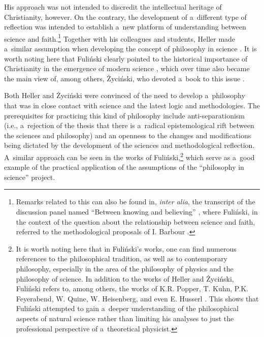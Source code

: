 His approach was not intended to discredit the intellectual heritage of Christianity, however. On the contrary, the development of a~different type of reflection was intended to establish a~new platform of understanding between science and faith.\footnote{Remarks related to this can also be found in, \textit{inter alia}, the transcript of the discussion panel named ``Between knowing and believing'' 
\parencite[][]{heller_watpliwosci_1990}, %
 where Fuliński, in the context of the question about the relationship between science and faith, referred to the methodological proposals of I. Barbour 
\parencite[][]{fulinski_glos_1991}.%
} Together with his colleagues and students, Heller made a~similar assumption when developing the concept of philosophy in science 
\parencites[e.g][]{polak_science-religion_2021}[][]{}[][]{trombik_stworzyc_2022}. %
 It is worth noting here that Fuliński clearly pointed to the historical importance of Christianity in the emergence of modern science 
\parencite[][]{janik_fizyka_1981}, %
 which over time also became the main view of, among others, Życiński, who devoted a~book to this issue 
\parencite[][]{zycinski_inspiracje_2000}.%




Both Heller and Życiński were convinced of the need to develop a~philosophy that was in close contact with science and the latest logic and methodologies. The prerequisites for practicing this kind of philosophy include anti-separationism (i.e., a~rejection of the thesis that there is a~radical epistemological rift between the sciences and philosophy) and an openness to the changes and modifications being dictated by the development of the sciences and methodological reflection. A~similar approach can be seen in the works of Fuliński,\footnote{It is worth noting here that in Fuliński's works, one can find numerous references to the philosophical tradition, as well as to contemporary philosophy, especially in the area of the philosophy of physics and the philosophy of science. In addition to the works of Heller and Życiński, Fuliński refers to, among others, the works of K.R. Popper, T. Kuhn, P.K. Feyerabend, W. Quine, W. Heisenberg, and even E. Husserl 
\parencite[see][]{wszolek_o_1996}. %
 This shows that Fuliński attempted to gain a~deeper understanding of the philosophical aspects of natural science rather than limiting his analyses to just the professional perspective of a~theoretical physicist.} which serve as a~good example of the practical application of the assumptions of the ``philosophy in science'' project.



